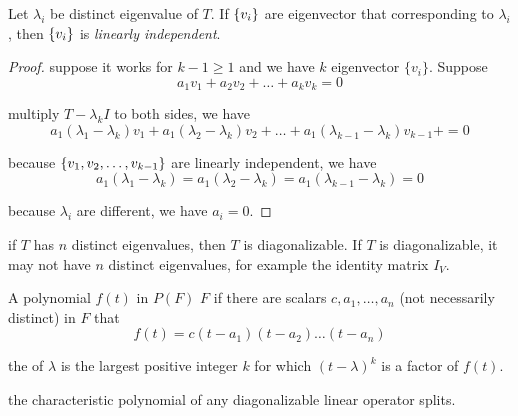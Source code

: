\begin{theorem}
    Let ${\lambda_i}$ be distinct eigenvalue of $T$. If $\set{v_i}$ are eigenvector that corresponding to $\lambda_i$, then $\set{v_i}$ is \emph{linearly independent}.
\end{theorem}
\begin{proof}
    suppose it works for $k - 1 \geq 1$ and we have $k$ eigenvector $\{ v_i\}$. Suppose
    \begin{equation*}
        a_1 v_1 + a_2 v_2 + \dots + a_k v_k = 0
    \end{equation*}
    
    multiply $T - \lambda_k I$ to both sides, we have
    \begin{equation*}
        a_1(\lambda_1 - \lambda_k) v_1 + a_1(\lambda_2 - \lambda_k) v_2 +  \dots + a_1(\lambda_{k-1} - \lambda_k) v_{k-1} +  = 0
    \end{equation*}
    
    because $\set{v_1, v_2, \dots, v_{k-1} }$ are linearly independent, we have 
    \begin{equation*}
        a_1(\lambda_1 - \lambda_k) = a_1(\lambda_2 - \lambda_k) =  a_1(\lambda_{k-1} - \lambda_k) = 0
    \end{equation*}
    
    because $\lambda_i$ are different, we have $a_i = 0$.
\end{proof}

\begin{theorem}
    if $T$ has $n$ distinct eigenvalues, then $T$ is diagonalizable. If $T$ is diagonalizable, it may not have $n$ distinct eigenvalues, for example the identity matrix $I_V$.
\end{theorem}

\begin{definition}
    A polynomial $f(t)$ in $P(F)$  $F$ if there are scalars $c, a_1, \dots, a_n$ (not necessarily distinct) in $F$ that
    \begin{equation*}
        f(t) = c(t - a_1)(t - a_2) \dots (t-a_n)
    \end{equation*}
    
    the  of $\lambda$ is the largest positive integer $k$ for which $(t - \lambda)^k$ is a factor of $f(t)$.
\end{definition}

\begin{theorem}
    the characteristic polynomial of any diagonalizable linear operator splits.
\end{theorem}

